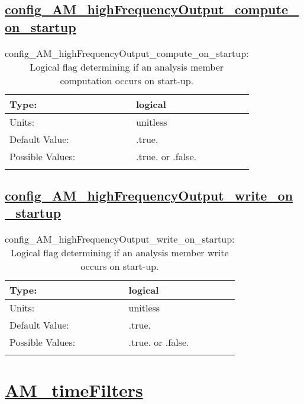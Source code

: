 \subsection[config\_AM\_highFrequencyOutput\_compute\_on\_startup]{\hyperref[sec:nm_tab_AM_highFrequencyOutput]{config\_AM\_highFrequencyOutput\_compute\_on\_startup}}
\label{subsec:nm_sec_config_AM_highFrequencyOutput_compute_on_startup}
\begin{center}
\begin{longtable}{| p{2.0in} || p{4.0in} |}
    \hline
    Type: & logical \\
    \hline
    Units: & \si{unitless} \\
    \hline
    Default Value: & .true. \\
    \hline
    Possible Values: & .true. or .false. \\
    \hline
    \caption{config\_AM\_highFrequencyOutput\_compute\_on\_startup: Logical flag determining if an analysis member computation occurs on start-up.}
\end{longtable}
\end{center}
\subsection[config\_AM\_highFrequencyOutput\_write\_on\_startup]{\hyperref[sec:nm_tab_AM_highFrequencyOutput]{config\_AM\_highFrequencyOutput\_write\_on\_startup}}
\label{subsec:nm_sec_config_AM_highFrequencyOutput_write_on_startup}
\begin{center}
\begin{longtable}{| p{2.0in} || p{4.0in} |}
    \hline
    Type: & logical \\
    \hline
    Units: & \si{unitless} \\
    \hline
    Default Value: & .true. \\
    \hline
    Possible Values: & .true. or .false. \\
    \hline
    \caption{config\_AM\_highFrequencyOutput\_write\_on\_startup: Logical flag determining if an analysis member write occurs on start-up.}
\end{longtable}
\end{center}
\section[AM\_timeFilters]{\hyperref[sec:nm_tab_AM_timeFilters]{AM\_timeFilters}}
\label{sec:nm_sec_AM_timeFilters}
